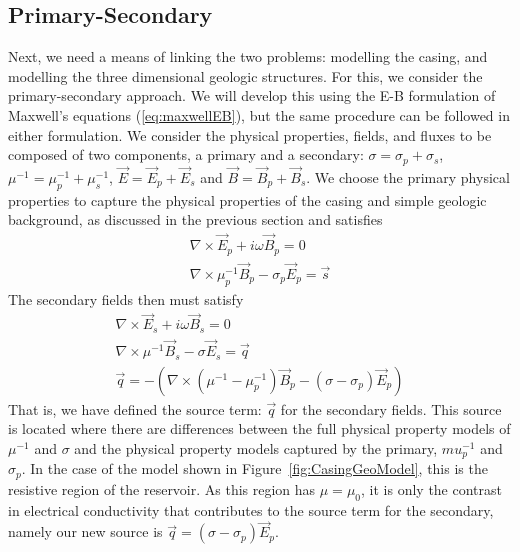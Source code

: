 \documentclass{segabs}
\newcommand{\curl}{{\nabla \times}}
\begin{document}
\subsection{Primary-Secondary}
Next, we need a means of linking the two problems: modelling the casing, and modelling the three dimensional geologic structures. For this, we consider the primary-secondary approach. We will develop this using the E-B formulation of Maxwell's equations (\ref{eq:maxwellEB}), but the same procedure can be followed in either formulation. We consider the physical properties, fields, and fluxes to be composed of two components, a primary and a secondary: $\sigma = \sigma_p + \sigma_s$, $\mu^{-1} = \mu_p^{-1} + \mu_s^{-1}$, $\vec{E} = \vec{E}_p + \vec{E}_s$ and $\vec{B} = \vec{B}_p + \vec{B}_s$. We choose the primary physical properties to capture the physical properties of the casing and simple geologic background, as discussed in the previous section and satisfies
\begin{equation}
\begin{split}
	\curl \vec{E}_p + i \omega \vec{B}_p = 0 \\
	\curl \mu^{-1}_p \vec{B}_p - \sigma_p \vec{E}_p = \vec{s}
\end{split}
\label{eq:primary}
\end{equation}
The secondary fields then must satisfy
\begin{equation}
\begin{split}
	\curl \vec{E}_s + i \omega \vec{B}_s = 0 \\
	\curl \mu^{-1}\vec{B}_s - \sigma \vec{E}_s = \vec{q} \\
	\vec{q} =  - (\curl (\mu^{-1} - \mu_p^{-1} ) \vec{B}_p - (\sigma - \sigma_p) \vec{E}_p)
\end{split}
\label{eq:secondary}
\end{equation}
That is, we have defined the source term: $\vec{q}$ for the secondary fields. This source is located where there are differences between the full physical property models of $\mu^{-1}$ and $\sigma$ and the physical property models captured by the primary, $mu^{-1}_p$ and $\sigma_p$. In the case of the model shown in Figure~\ref{fig:CasingGeoModel}, this is the resistive region of the reservoir.  As this region has $\mu = \mu_0$, it is only the contrast in electrical conductivity that contributes to the source term for the secondary, namely our new source is $\vec{q} = (\sigma - \sigma_p) \vec{E}_p$.
\end{document}
